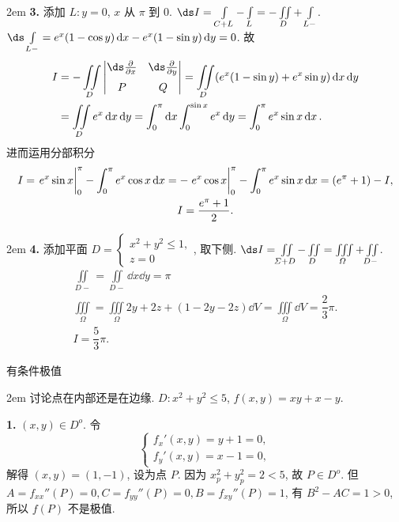 \documentclass[UTF8,14pt,normal]{ctexart}
\begin{document}
    \hangindent 2em
    \noindent
    \textbf{3.} 添加 \(L \colon y = 0\), \(x\) 从 \(\pi\) 到 \(0\). \(\ds I = \int\limits_{C + L} - \int\limits_{L} = - \iint\limits_D + \int\limits_{L-}\). \\[1.2ex]
    \(\ds \int\limits_{L-} = e^x(1 - \cos y) \dd{x} - e^x(1 - \sin y) \dd{y} = 0\). 故
    \begin{align*}
        I & = - \iint\limits_D \begin{vmatrix}
            \ds\pdv{x} & \ds\pdv{y} \\[1.5ex]
            P & Q
        \end{vmatrix}= \iint\limits_D (e^x(1 - \sin y) + e^x \sin y) \dd{x} \dd{y} \\
        & = \iint\limits_D e^x \dd{x} \dd{y} = \int_{0}^{\pi} \dd{x} \int_{0}^{\sin x} e^x \dd{y} = \int_{0}^{\pi} e^x \sin x \dd{x}.
    \end{align*}
    进而运用分部积分
    \begin{gather*}
        I = \eval{e^x \sin x}_{0}^{\pi} - \int_{0}^{\pi} e^x \cos x \dd{x} = - \eval{e^x \cos x}_{0}^{\pi} - \int_{0}^{\pi} e^x \sin x \dd{x} = (e^\pi + 1) - I, \\
        I = \dfrac{e^\pi + 1}{2}.
    \end{gather*}

    \hangindent 2em
    \noindent
    \textbf{4.} 添加平面 \(D = \begin{cases}
        x^2 + y^2 \leqslant 1, \\
        z = 0
    \end{cases}\), 取下侧. \(\ds I = \iint\limits_{\varSigma + D} - \iint\limits_{D} = \iiint\limits_{\varOmega} + \iint\limits_{D-}\).
    \begin{gather*}
        \iint\limits_{D-} = \iint\limits_{D-} \dd{x} \dd{y} = \pi \\
        \iiint\limits_{\varOmega} = \iiint\limits_{\varOmega} 2y + 2z + (1 - 2y - 2z) \dd{V} = \iiint\limits_{\varOmega} \dd{V} = \dfrac{2}{3} \pi. \\
        I = \dfrac{5}{3} \pi.
    \end{gather*}

 有条件极值

    \hangindent 2em
    \noindent
    讨论点在内部还是在边缘. \(D \colon x^2 + y^2 \leqslant 5\), \(f(x, y) = xy + x - y\).

    \textbf{1.} \((x, y) \in D^o\). 令
    \[
        \begin{cases}
            f_x'(x, y) = y + 1 = 0, \\
            f_y'(x, y) = x - 1 = 0,
        \end{cases}
    \]
    解得 \((x, y) = (1, -1)\), 设为点 \(P\). 因为 \(x_p^2 + y_p^2 = 2 < 5\), 故 \(P \in D^o\). 但 \(A = f_{xx}''(P) = 0, C = f_{yy}''(P) = 0, B = f_{xy}''(P) = 1\), 有 \(B^2 - AC = 1 > 0\), 所以 \(f(P)\) 不是极值.
\end{document}
